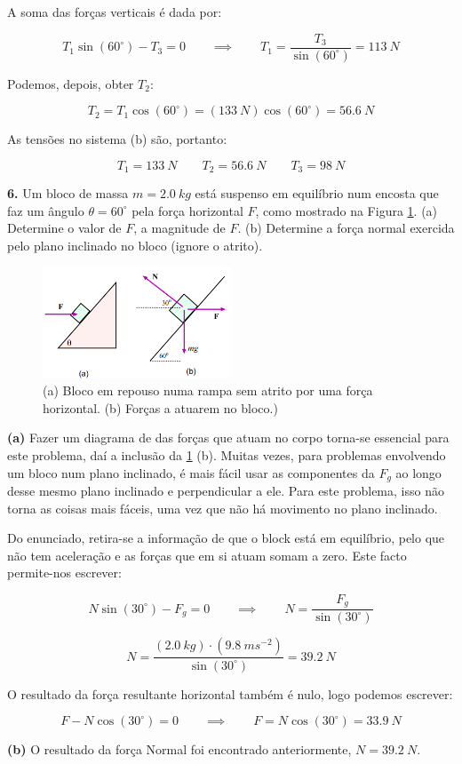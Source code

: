 A soma das forças verticais é dada por:

$$
T_1\sin(60^{\circ})-T_3=0 \qquad \implies \qquad T_1=\frac{T_3}{\sin(60^{\circ})}=113\ N
$$

Podemos, depois, obter $T_2$:

$$
T_2=T_1\cos(60^{\circ})=(133\ N)\cos(60^{\circ})=56.6\ N
$$

As tensões no sistema (b) são, portanto:

$$
T_1=133\ N \qquad T_2=56.6\ N \qquad T_3=98\ N
$$

\textbf{6.} Um bloco de massa $m=2.0\ kg$ está suspenso em equilíbrio num encosta que faz um ângulo $\theta=60^{\circ}$ pela força horizontal $F$, como mostrado na Figura \ref{fig:6plano}. (a) Determine o valor de $F$, a magnitude de $F$. (b) Determine a força normal exercida pelo plano inclinado no bloco (ignore o atrito).
\linebreak
\begin{figure}[h!]
    \centering
    \includegraphics[width=0.5\textwidth]{forças/fig/ex6.png}
    \caption{(a) Bloco em repouso numa rampa sem atrito por uma força horizontal. (b) Forças a atuarem no bloco.)}
    \label{fig:6plano}
\end{figure}

\textbf{(a)} Fazer um diagrama de das forças que atuam no corpo torna-se essencial para este problema, daí a inclusão da \ref{fig:6plano} (b). Muitas vezes, para problemas envolvendo um bloco num plano inclinado, é mais fácil usar as componentes da $F_g$ ao longo desse mesmo plano inclinado e perpendicular a ele. Para este problema, isso não torna as coisas mais fáceis, uma vez que não há movimento no plano inclinado.

Do enunciado, retira-se a informação de que o block está em equilíbrio, pelo que não tem aceleração e as forças que em si atuam somam a zero. Este facto permite-nos escrever:

$$
N\sin(30^{\circ})-F_g=0 \qquad \implies \qquad N=\frac{F_g}{\sin(30^{\circ})}
$$

$$
N=\frac{(2.0\ kg)\cdot(9.8\ ms^{-2})}{\sin(30^{\circ})}=39.2\ N
$$

O resultado da força resultante horizontal também é nulo, logo podemos escrever:

$$
F-N\cos(30^{\circ})=0 \qquad \implies \qquad F=N\cos(30^{\circ})=33.9\ N
$$

\textbf{(b)} O resultado da força Normal foi encontrado anteriormente, $N=39.2\ N$.